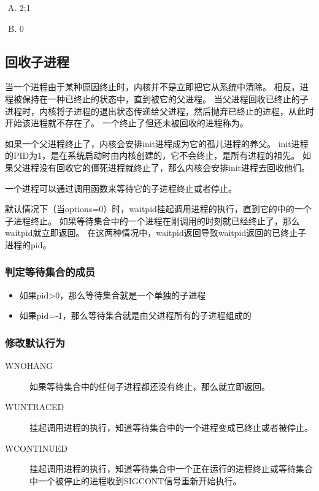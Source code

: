 {{        %
        \begin{practicec}
            \begin{enumerate}[A.]
                \item 2;1
                \item 0
            \end{enumerate}
        \end{practicec}
    }

    \subsection{回收子进程}
    {
        当一个进程由于某种原因终止时，内核并不是立即把它从系统中清除。
        相反，进程被保持在一种已终止的状态中，直到被它的父进程。
        当父进程回收已终止的子进程时，内核将子进程的退出状态传递给父进程，然后抛弃已终止的进程，从此时开始该进程就不存在了。
        一个终止了但还未被回收的进程称为。

        如果一个父进程终止了，内核会安排init进程成为它的孤儿进程的养父。
        init进程的PID为1，是在系统启动时由内核创建的，它不会终止，是所有进程的祖先。
        如果父进程没有回收它的僵死进程就终止了，那么内核会安排init进程去回收他们。

        一个进程可以通过调用函数来等待它的子进程终止或者停止。

        默认情况下（当options=0）时，waitpid挂起调用进程的执行，直到它的中的一个子进程终止。
        如果等待集合中的一个进程在刚调用的时刻就已经终止了，那么waitpid就立即返回。
        在这两种情况中，waitpid返回导致waitpid返回的已终止子进程的pid。

        \subsubsection{判定等待集合的成员}
        {
            \begin{itemize}
                \item 如果pid>0，那么等待集合就是一个单独的子进程
                \item 如果pid=-1，那么等待集合就是由父进程所有的子进程组成的
            \end{itemize}
        }

        \subsubsection{修改默认行为}
        {
            \begin{description}
                \item[WNOHANG] 如果等待集合中的任何子进程都还没有终止，那么就立即返回。
                \item[WUNTRACED] 挂起调用进程的执行，知道等待集合中的一个进程变成已终止或者被停止。
                \item[WCONTINUED] 挂起调用进程的执行，知道等待集合中一个正在运行的进程终止或等待集合中一个被停止的进程收到SIGCONT信号重新开始执行。
            \end{description}
        }

}}
